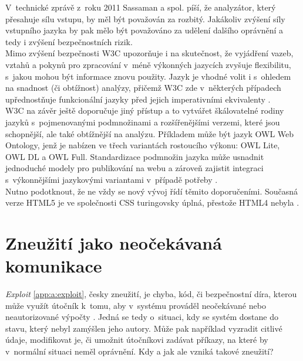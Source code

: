 V~technické zprávě z~roku 2011 \cite[str. 22]{Sass2011} Sassaman a spol. píší, že analyzátor, který přesahuje sílu vstupu, by měl být považován za 
rozbitý. Jakákoliv zvýšení síly vstupního jazyka by pak mělo být považováno za udělení dalšího oprávnění a tedy i zvýšení bezpečnostních rizik. \\

Mimo zvýšení bezpečnosti W3C upozorňuje i na skutečnost, že vyjádření vazeb, vztahů a pokynů pro zpracování v~méně výkonných jazycích zvyšuje 
flexibilitu, s~jakou mohou být informace znovu použity. Jazyk je vhodné volit i s~ohledem na snadnost (či obtížnost) analýzy, přičemž W3C zde 
v~některých případech upřednostňuje funkcionální jazyky před jejich imperativními ekvivalenty \cite{w3cpower}. \\

W3C na závěr ještě doporučuje jiný přístup a to vytvářet škálovatelné rodiny jazyků s~pojmenovanými podmnožinami a rozšířenějšími verzemi, 
které jsou schopnější, ale také obtížnější na analýzu. Příkladem může být jazyk OWL Web Ontology, jenž je nabízen ve třech variantách rostoucího 
výkonu: OWL Lite, OWL DL a OWL Full. Standardizace podmnožin jazyka může usnadnit jednoduché modely pro publikování na webu a zároveň zajistit 
integraci s~výkonnějšími jazykovými variantami v~případě potřeby \cite{w3cpower}. \\

Nutno podotknout, že ne vždy se nový vývoj řídí těmito doporučeními. Současná verze HTML5 je ve společnosti CSS turingovsky úplná, 
přestože HTML4 nebyla \cite[str. 22]{Sass2011}.

\section{Zneužití jako neočekávaná komunikace} \label{sec:4:exploits}
\textit{Exploit} \ref{app:a:exploit}, česky zneužití, je chyba, kód, či bezpečnostní díra, kterou může využít útočník k~tomu, aby v~systému prováděl 
neočekávané nebo neautorizované výpočty \cite[str. 135]{Slovnik2015}. Jedná se tedy o~situaci, kdy se systém dostane do stavu, který nebyl zamýšlen 
jeho autory. Může pak například vyzradit citlivé údaje, modifikovat je, či umožnit útočníkovi zadávat příkazy, na které by v~normální situaci neměl 
oprávnění. Kdy a jak ale vzniká takové zneužití? \\

